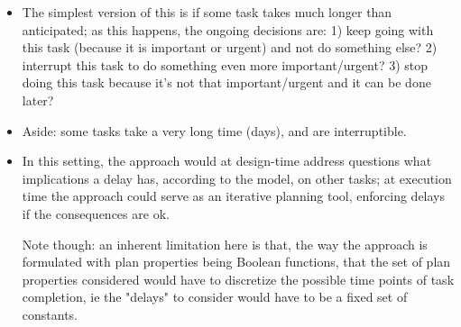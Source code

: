 \begin{itemize}
\item The simplest version of this is if some task takes much longer than anticipated; as this happens, the ongoing decisions are: 1) keep going with this task (because it is important or urgent) and not do something else?  2) interrupt this task to do something even more important/urgent?  3) stop doing this task because it's not that important/urgent and it can be done later?
\item Aside: some tasks take a very long time (days), and are interruptible.
\item In this setting, the approach would at design-time address questions what implications a delay has, according to the model, on other tasks; at execution time the approach could serve as an iterative planning tool, enforcing delays if the consequences are ok. 

Note though: an inherent limitation here is that, the way the approach is formulated with plan properties being Boolean functions, that the set of plan properties considered would have to discretize the possible time points of task completion, ie the "delays" to consider would have to be a fixed set of constants.

\end{itemize}




